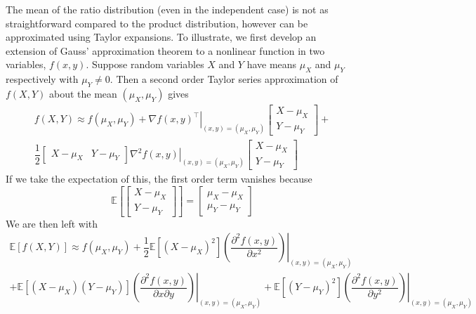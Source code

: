 \documentclass[11pt]{report} %
\begin{document}
The mean of the ratio distribution (even in the independent case) is not as straightforward compared to the product distribution, however can be approximated using Taylor expansions. To illustrate, we first develop an extension of Gauss' approximation theorem to a nonlinear function in two variables, $f\left(x, y\right)$. Suppose random variables $X$ and $Y$ have means $\mu_{X}$ and $\mu_{Y}$ respectively with $\mu_{Y} \neq 0$. Then a second order Taylor series approximation of $f\left(X, Y\right)$ about the mean $\left(\mu_{X}, \mu_{Y}\right)$ gives
\begin{multline}
f\left(X, Y\right) \approx f\left(\mu_{X}, \mu_{Y}\right) + \left.\nabla f\left(x, y\right)^{\top}\right|_{\left(x, y\right) = \left(\mu_{X}, \mu_{Y}\right)}\begin{bmatrix} X - \mu_{X} \\ Y - \mu_{Y}\end{bmatrix} + \\
\dfrac{1}{2}\begin{bmatrix} X - \mu_{X} & Y - \mu_{Y}\end{bmatrix}\left.\nabla^{2} f\left(x, y\right)\right|_{\left(x, y\right) = \left(\mu_{X}, \mu_{Y}\right)}\begin{bmatrix} X - \mu_{X} \\ Y - \mu_{Y}\end{bmatrix}
\end{multline}
If we take the expectation of this, the first order term vanishes because
\begin{equation}
\mathbb{E}\left[\begin{bmatrix} X - \mu_{X} \\ Y - \mu_{Y}\end{bmatrix}\right] = \begin{bmatrix} \mu_{X} - \mu_{X} \\ \mu_{Y} - \mu_{Y}\end{bmatrix}
\end{equation}
We are then left with
\begin{multline}
\mathbb{E}\left[f\left(X, Y\right)\right] \approx f\left(\mu_{X}, \mu_{Y}\right) + \dfrac{1}{2}\mathbb{E}\left[\left(X - \mu_{X}\right)^{2}\right]\left.\left(\dfrac{\partial^{2}f\left(x, y\right)}{\partial x^{2}}\right)\right|_{\left(x, y\right) = \left(\mu_{X}, \mu_{Y}\right)} \\
+\mathbb{E}\left[\left(X - \mu_{X}\right)\left(Y - \mu_{Y}\right)\right]\left.\left(\dfrac{\partial^{2}f\left(x, y\right)}{\partial x \partial y}\right)\right|_{\left(x, y\right) = \left(\mu_{X}, \mu_{Y}\right)} + \mathbb{E}\left[\left(Y - \mu_{Y}\right)^{2}\right]\left.\left(\dfrac{\partial^{2}f\left(x, y\right)}{\partial y^{2}}\right)\right|_{\left(x, y\right) = \left(\mu_{X}, \mu_{Y}\right)}
\end{multline}
\end{document}
